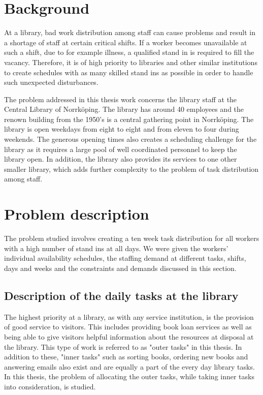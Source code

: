 
\section{Background}


At a library, bad work distribution among staff can cause problems and result in a shortage of staff at certain critical shifts. If a worker becomes unavailable at such a shift, due to for example illness, a qualified stand in is required to fill the vacancy. Therefore, it is of high priority to libraries and other similar institutions to create schedules with as many skilled stand ins as possible in order to handle such unexpected disturbances. 

The problem addressed in this thesis work concerns the library staff at the Central Library of Norrköping. The library has around 40 employees and the renown building from the 1950's is a central gathering point in Norrköping. The library is open weekdays from eight to eight and from eleven to four during weekends. The generous opening times also creates a scheduling challenge for the library as it requires a large pool of well coordinated personnel to keep the library open. In addition, the library also provides its services to one other smaller library, which adds further complexity to the problem of task distribution among staff.

\section{Problem description}

The problem studied involves creating a ten week task distribution for all workers with a high number of stand ins at all days. We were given the workers' individual availability schedules, the staffing demand at different tasks, shifts, days and weeks and the constraints and demands discussed in this section. 

\subsection{Description of the daily tasks at the library} \label{section:library_tasks}
The highest priority at a library, as with any service institution, is the provision of good service to visitors. This includes providing book loan services as well as being able to give visitors helpful information about the resources at disposal at the library. This type of work is referred to as "outer tasks" in this thesis. In addition to these, "inner tasks" such as sorting books, ordering new books and answering emails also exist and are equally a part of the every day library tasks. In this thesis, the problem of allocating the outer tasks, while taking inner tasks into consideration, is studied.

